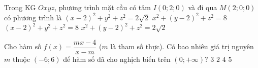 \begin{ex}%
	Trong KG $Oxyz$, phương trình mặt cầu có tâm $I(0;2;0)$ và đi qua $M(2;0;0)$ có phương trình là
	\choice
	{$(x-2)^2+y^2+z^2=2\sqrt{2}$}
	{\True $x^2+(y-2)^2+z^2=8$}
	{$(x-2)^2+y^2+z^2=8$}
	{$x^2+(y-2)^2+z^2=2\sqrt{2}$}
\end{ex}

\begin{ex}%
	Cho hàm số $f(x)=\dfrac{mx-4}{x-m}$ ($m$ là tham số thực). Có bao nhiêu giá trị nguyên $m$ thuộc $(-6;6)$ để hàm số đã cho nghịch biến trên $(0;+\infty)$?
	\choice
	{\True $3$}
	{$2$}
	{$4$}
	{$5$}
\end{ex}

